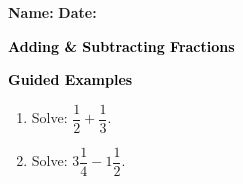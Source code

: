 \documentclass[12pt, letterpaper, fleqn]{article}
\begin{document}
\textbf{Name:} \underline{\hspace{5cm}}
\hfill
\textbf{Date:} \underline{\hspace{3cm}}\\

\begin{tcolorbox}[colback=customteal!20]
    \large\textcolor{black}{\textbf{Adding \& Subtracting Fractions}}
\end{tcolorbox}
\newpage
\begin{tcolorbox}[colback=customteal!20]
    \large\textcolor{black}{\textbf{Guided Examples}}
\end{tcolorbox}
\begin{enumerate}[itemsep=3.5cm, leftmargin=0.6cm]
\item Solve: $\dfrac{1}{2} + \dfrac{1}{3}$.
\vspace{3cm}
\item Solve: $3\dfrac{1}{4} - 1\dfrac{1}{2}$.
\end{enumerate}
\end{document}
